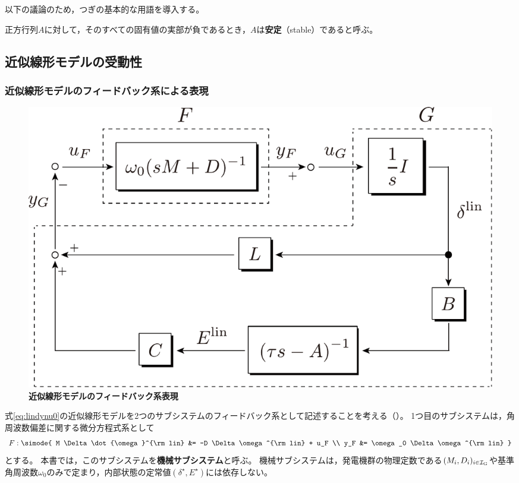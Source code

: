 \documentclass[tombow,dvipdfmx]{corona-a5-1.1}
\begin{document}
以下の議論のため，つぎの基本的な用語を導入する。

\begin{定義}[正方行列の安定性]
\label{def:matsta}
正方行列$A$に対して，そのすべての固有値の実部が負であるとき，$A$は\textbf{安定}（stable）であると呼ぶ。
\end{定義}



\subsection{近似線形モデルの受動性\advanced}\label{sec:linpasana}

\smallskip
\subsubsection{近似線形モデルのフィードバック系による表現}

\begin{figure}[t]
\centering
\includegraphics[width = .7\linewidth]{figs/FandG}
\medskip
\caption{\textbf{近似線形モデルのフィードバック系表現}}
\label{fig:GandG}
\medskip
\end{figure}


式\ref{eq:lindynu0}の近似線形モデルを2つのサブシステムのフィードバック系として記述することを考える（）。
1つ目のサブシステムは，角周波数偏差に関する微分方程式系として
\begin{align}\label{eq:Fss}
F: \simode{
M \Delta \dot{\omega}^{\rm lin} &= -D \Delta \omega^{\rm lin}
+
u_F \\
y_F &= \omega_0 \Delta \omega^{\rm lin}
}
\end{align}
とする。
本書では，このサブシステムを\textbf{機械サブシステム}と呼ぶ。
機械サブシステムは，発電機群の物理定数である$(M_i,D_i)_{i\in \mathcal{I}_{\rm G}}$や基準角周波数$\omega_0$のみで定まり，内部状態の定常値$(\delta^{\star},E^{\star})$には依存しない。
\end{document}
